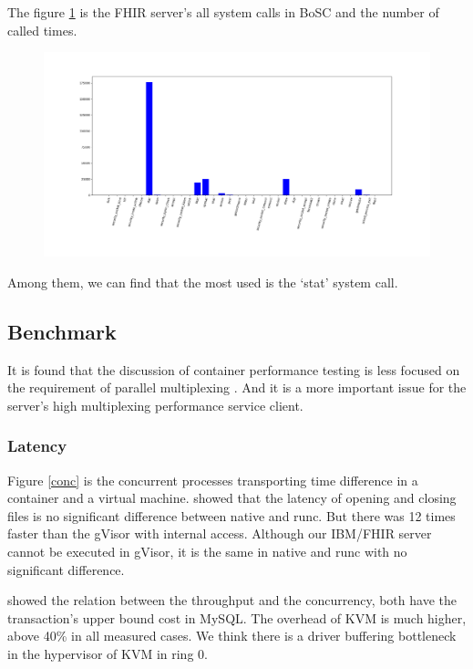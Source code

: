 The figure \ref{hist} is the FHIR server's all system calls in
BoSC\cite{1495942} and the number of called times.
\begin{figure}
    \centering
    \includegraphics[width=\textwidth]{src/hist.png}
    \label{hist}
\end{figure}
Among them, we can find that the most used is the `stat' system call.

\subsection{Benchmark}
It is found that the discussion of container performance testing is less
focused on the requirement of parallel multiplexing
\cite{7371699,KOZHIRBAYEV2017175,7095802,234857}. And it is a more
important issue for the server's high multiplexing performance service client.

\subsubsection{Latency}
Figure \ref{conc} is the concurrent processes transporting time
difference in a container and a virtual machine.
\textcite{234857} showed that the latency of opening and closing files
is no significant difference between native and runc. But there was 12 times
faster than the gVisor with internal access. Although our IBM/FHIR server
cannot be executed in gVisor, it is the same in native and runc with no
significant difference.

\textcite{7095802} showed the relation between the throughput and the concurrency,
both have the transaction's upper bound cost in MySQL. The overhead of KVM is
much higher, above 40\% in all measured cases. We think there is a driver
buffering bottleneck in the hypervisor of KVM in ring 0.


